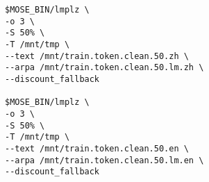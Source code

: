 \documentclass[11pt]{article}
\begin{document}
\begin{lstlisting}
$MOSE_BIN/lmplz \
-o 3 \
-S 50% \
-T /mnt/tmp \
--text /mnt/train.token.clean.50.zh \
--arpa /mnt/train.token.clean.50.lm.zh \
--discount_fallback

$MOSE_BIN/lmplz \
-o 3 \
-S 50% \
-T /mnt/tmp \
--text /mnt/train.token.clean.50.en \
--arpa /mnt/train.token.clean.50.lm.en \
--discount_fallback
\end{lstlisting}
\end{document}
